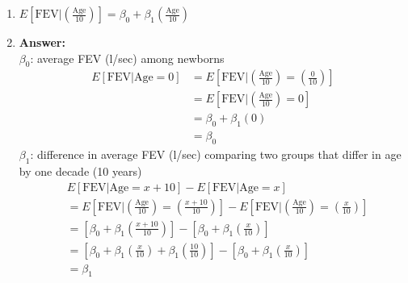 \documentclass{article}
\begin{document}
\begin{enumerate}
\newpage
\item $E[\text{FEV}|\left(\frac{\text{Age}}{10}\right)] = \beta_0 + \beta_1 \left(\frac{\text{Age}}{10}\right)$ 
\item[] \color{blue} \textbf{Answer:} \\
$\beta_0$: average FEV (l/sec) among newborns \\
\begin{align*}
E[\text{FEV}|\text{Age} =0] &= E[\text{FEV}|\left(\frac{\text{Age}}{10}\right)=\left(\frac{0}{10}\right)]\\
& = E[\text{FEV}|\left(\frac{\text{Age}}{10}\right) =0]\\
& = \beta_0+ \beta_1(0) \\
& = \beta_0
\end{align*}
$\beta_1$: difference in average FEV (l/sec) comparing two groups that differ in age by one decade (10 years)
\begin{align*}
&E[\text{FEV}|\text{Age} = x + 10] - E[\text{FEV}|\text{Age} = x ] \\
&=E[\text{FEV}|\left(\frac{\text{Age}}{10}\right)= \left(\frac{x+10}{10}\right)] - E[\text{FEV}|\left(\frac{\text{Age}}{10}\right)= \left(\frac{x}{10}\right)]\\
&=\left[\beta_0 + \beta_1\left(\frac{x+10}{10}\right)\right] - \left[\beta_0 + \beta_1\left(\frac{x}{10}\right)\right] \\
&=\left[\beta_0 + \beta_1\left(\frac{x}{10}\right) + \beta_1\left(\frac{10}{10}\right)\right] -\left[\beta_0 + \beta_1\left(\frac{x}{10}\right) \right]\\
& = \beta_1
\end{align*}
\color{black}


\end{enumerate}
\end{document}
